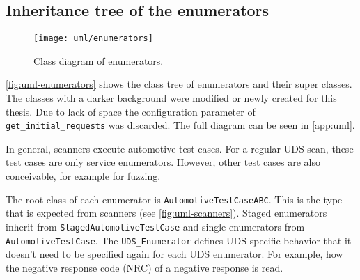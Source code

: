 

\subsection{Inheritance tree of the enumerators}

\begin{figure}[htb]
    \centering
    \texttt{[image: uml/enumerators]}
    \caption{Class diagram of enumerators.}
    \label{fig:uml-enumerators}
\end{figure}

\autoref{fig:uml-enumerators} shows the class tree of enumerators and their super classes. The classes with a darker background were modified or newly created for this thesis. Due to lack of space the configuration parameter of \texttt{get_initial_requests} was discarded. The full diagram can be seen in \autoref{app:uml}.

In general, scanners execute automotive test cases. For a regular UDS scan, these test cases are only service enumerators. However, other test cases are also conceivable, for example for fuzzing.

The root class of each enumerator is \texttt{AutomotiveTestCaseABC}. This is the type that is expected from scanners (see \autoref{fig:uml-scanners}). Staged enumerators inherit from \texttt{StagedAutomotiveTestCase} and single enumerators from \texttt{AutomotiveTestCase}. The \texttt{UDS_Enumerator} defines UDS-specific behavior that it doesn't need to be specified again for each UDS enumerator. For example, how the negative response code (NRC) of a negative response is read.

